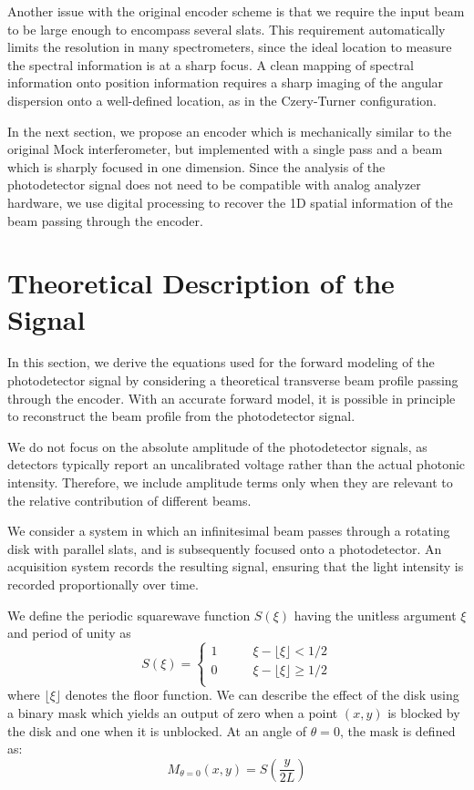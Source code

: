 \documentclass[12pt]{report}
\begin{document}
	Another issue with the original encoder scheme is that we require the input beam to be large enough to encompass several slats. This requirement automatically limits the resolution in many spectrometers, since the ideal location to measure the spectral information is at a sharp focus. A clean mapping of spectral information onto position information requires a sharp imaging of the angular dispersion onto a well-defined location, as in the Czery-Turner configuration.
	
	In the next section, we propose an encoder which is mechanically similar to the original Mock interferometer, but implemented with a single pass and a beam which is sharply focused in one dimension. Since the analysis of the photodetector signal does not need to be compatible with analog analyzer hardware, we use digital processing to recover the 1D spatial information of the beam passing through the encoder.
	
	\section{Theoretical Description of the Signal}
	In this section, we derive the equations used for the forward modeling of the photodetector signal by considering a theoretical transverse beam profile passing through the encoder. With an accurate forward model, it is possible in principle to reconstruct the beam profile from the photodetector signal.
	
	We do not focus on the absolute amplitude of the photodetector signals, as detectors typically report an uncalibrated voltage rather than the actual photonic intensity. Therefore, we include amplitude terms only when they are relevant to the relative contribution of different beams.
	
	We consider a system in which an infinitesimal beam passes through a rotating disk with parallel slats, and is subsequently focused onto a photodetector. An acquisition system records the resulting signal, ensuring that the light intensity is recorded proportionally over time.
	
	We define the periodic squarewave function $S(\xi)$ having the unitless argument $\xi$ and period of unity as
	\begin{equation}
		S(\xi) =
		\begin{cases}
			1 &\qquad \xi - \lfloor \xi \rfloor < 1/2 \\
			0 &\qquad \xi - \lfloor \xi \rfloor \ge 1/2 \\
		\end{cases}
	\end{equation}
	where $\lfloor \xi \rfloor$ denotes the floor function. We can describe the effect of the disk using a binary mask which yields an output of zero when a point $(x,y)$ is blocked by the disk and one when it is unblocked. At an angle of $\theta=0$, the mask is defined as:
	\begin{equation}
		M_{\theta=0}(x,y) = S\left(\frac{y}{2L}\right)
	\end{equation}
	
\end{document}
